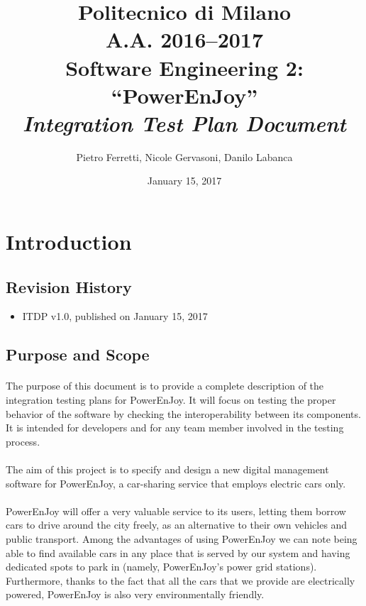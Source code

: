 \documentclass[english]{article}
\begin{document}
\title{Politecnico di Milano\\
 A.A. 2016–2017 \\
Software Engineering 2: “PowerEnJoy” \\
\emph{\textbf{Integration Test Plan Document}}}

\author{Pietro Ferretti, Nicole Gervasoni, Danilo Labanca}
\date{January 15, 2017}
\maketitle

\newpage

\tableofcontents{}

\newpage

\section{Introduction}

\subsection{Revision History}
\begin{itemize}
	\item{ITDP v1.0, published on January 15, 2017}
\end{itemize}
\subsection{Purpose and Scope}

\paragraph{}
The purpose of this document is to provide a complete description of the integration testing plans for PowerEnJoy. It will focus on testing the proper behavior of the software by checking the 
interoperability between its components.
It is intended for developers and for any team member involved in the testing process.

\paragraph{}
The aim of this project is to specify and design a new digital management software for PowerEnJoy, a car-sharing service that employs electric cars only.

\paragraph{}
PowerEnJoy will offer a very valuable service to its users, letting them borrow cars to drive around the city freely, as an alternative to their own vehicles and public transport.
Among the advantages of using PowerEnJoy we can note being able to find available cars in any place that is served by our system and having dedicated spots to park in (namely, PowerEnJoy's power grid stations).
Furthermore, thanks to the fact that all the cars that we provide are electrically powered, PowerEnJoy is also very environmentally friendly.
\end{document}
